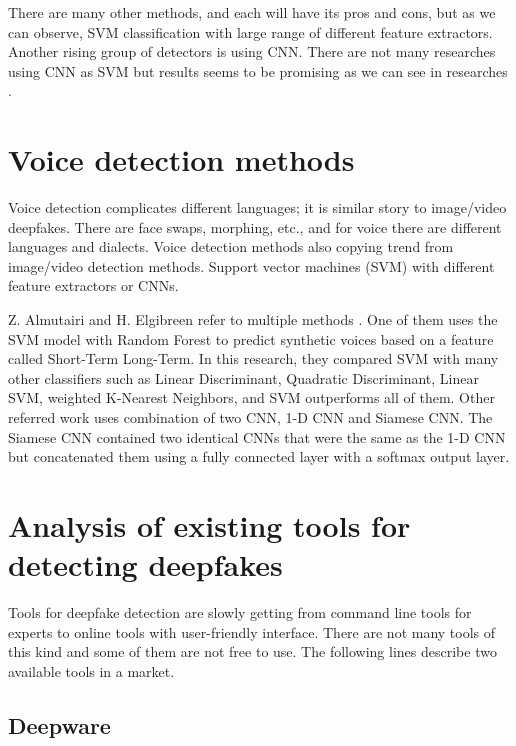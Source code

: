 There are many other methods, and each will have its pros and cons, but as we can observe, SVM classification with large range of different feature extractors. Another rising group of detectors is using CNN. There are not many researches using CNN as SVM but results seems to be promising as we can see in researches \cite{3DCNNArchitecturesAndAttentionMechanismsForDeepfakeDetection} \cite{CapsuleForensicsNetworksForDeepfakeDetection}.

\section{Voice detection methods}

Voice detection complicates different languages; it is similar story to image/video deepfakes. There are face swaps, morphing, etc., and for voice there are different languages and dialects. Voice detection methods also copying trend from image/video detection methods. Support vector machines (SVM) with different feature extractors or CNNs.

Z. Almutairi and H. Elgibreen refer to multiple methods \cite{ReviewOfModernAudioDeepfakeDetectionMethods}. One of them uses the SVM model with Random Forest to predict synthetic voices based on a feature called Short-Term Long-Term. In this research, they compared SVM with many other classifiers such as Linear Discriminant, Quadratic Discriminant, Linear SVM, weighted K-Nearest Neighbors, and SVM outperforms all of them. Other referred work uses combination of two CNN, 1-D CNN and Siamese CNN. The Siamese CNN contained two identical CNNs that were the same as the 1-D CNN but concatenated them using a fully connected layer with a softmax output layer. \cite{ReviewOfModernAudioDeepfakeDetectionMethods}

\section{Analysis of existing tools for detecting deepfakes}

Tools for deepfake detection are slowly getting from command line tools for experts to online tools with user-friendly interface. There are not many tools of this kind and some of them are not free to use. The following lines describe two available tools in a market.

\subsection{Deepware}

